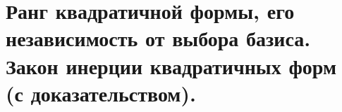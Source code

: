 \section{
    Ранг квадратичной формы, его независимость от выбора базиса. Закон инерции квадратичных форм (с доказательством). 
}




\newpage



